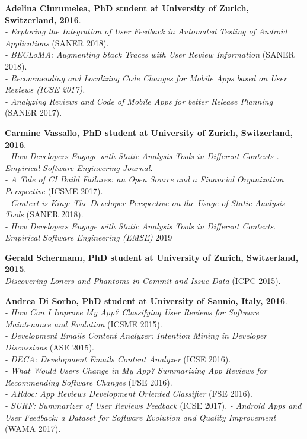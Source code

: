 \documentclass[10pt]{article}
\begin{document}
\begin{bibsection}
         
\item \textbf{Adelina Ciurumelea, PhD student at University of Zurich, Switzerland, 2016}.\\
          \textit{- Exploring the Integration of User Feedback in Automated Testing of Android Applications}  (SANER 2018).\\    
         \textit{- BECLoMA: Augmenting Stack Traces with User Review Information}  (SANER 2018).  \\
              \textit{- Recommending and Localizing Code Changes for Mobile Apps based on User Reviews (ICSE 2017).}\\   
       \textit{- Analyzing Reviews and Code of Mobile Apps for better Release Planning} (SANER 2017).
  

\item \textbf{Carmine Vassallo, PhD student at University of Zurich, Switzerland, 2016}.\\
        \textit{- How Developers Engage with Static Analysis Tools in Different Contexts .  Empirical Software Engineering Journal.}\\ 
       \textit{- A Tale of CI Build Failures: an Open Source and a Financial Organization Perspective} (ICSME 2017). \\
       \textit{- Context is King: The Developer Perspective on the Usage of Static Analysis Tools} (SANER 2018). \\
       \textit{- How Developers Engage with Static Analysis Tools in Different Contexts}. \emph{Empirical Software Engineering (EMSE)} 2019
   
\item \textbf{Gerald Schermann, PhD student at University of Zurich, Switzerland, 2015}.\\
        \textit{Discovering Loners and Phantoms in Commit and Issue Data} (ICPC 2015).


\item \textbf{Andrea Di Sorbo, PhD student at University of Sannio, Italy, 2016}.\\
        \textit{- How Can I Improve My App? Classifying User Reviews for Software Maintenance and Evolution} (ICSME 2015).  \\
                \textit{- Development Emails Content Analyzer: Intention Mining in Developer Discussions} (ASE 2015).   \\
                 \textit{- DECA: Development Emails Content Analyzer} (ICSE 2016).  \\
                               \textit{- What Would Users Change in My App? Summarizing App Reviews for Recommending Software Changes} (FSE 2016).\\
                               \textit{- ARdoc: App Reviews Development Oriented Classifier} (FSE 2016).\\
                               \textit{- SURF: Summarizer of User Reviews Feedback} (ICSE 2017).
                                      \textit{- Android Apps and User Feedback: a Dataset for Software Evolution and Quality Improvement}  (WAMA 2017). \\    


\end{bibsection}
\end{document}

